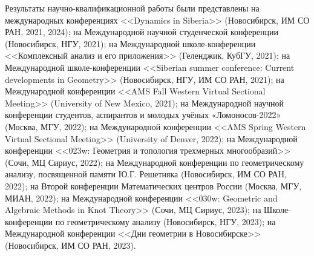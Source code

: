 Результаты научно-квалификационной работы были представлены на международных конференциях <<Dynamics in Siberia>> (Новосибирск, ИМ СО РАН, 2021, 2024); 
на Международной научной студенческой конференции (Новосибирск, НГУ, 2021);
на Международной школе-конференции <<Комплексный анализ и его приложения>> (Геленджик, КубГУ, 2021); 
на Международной школе-конференции <<Siberian summer conference: Current developments in Geometry>> (Новосибирск, НГУ, ИМ СО РАН, 2021); 
на Международной конференции <<AMS Fall Western Virtual Sectional Meeting>> (University of New Mexico, 2021); 
на Международной научной конференции студентов, аспирантов и молодых учёных «Ломоносов-2022» (Москва, МГУ, 2022); 
на Международной конференции <<AMS Spring Western Virtual Sectional Meeting>> (University of Denver, 2022); 
на Международной конференции <<023w: Геометрия и топология трехмерных многообразий>> (Сочи, МЦ Сириус, 2022); 
на Международной конференции по геометрическому анализу, посвященной памяти Ю.Г. Решетняка (Новосибирск, ИМ СО РАН, 2022); 
на Второй конференции Математических центров России (Москва, МГУ, МИАН, 2022); 
на Международной конференции <<030w: Geometric and Algebraic Methods in Knot Theory>> (Сочи, МЦ Сириус, 2023);
на Школе-конференции по геометрическому анализу
(Новосибирск, НГУ, 2023);
на Международной конференции <<Дни геометрии в Новосибирске>> (Новосибирск, ИМ СО РАН, 2023).




